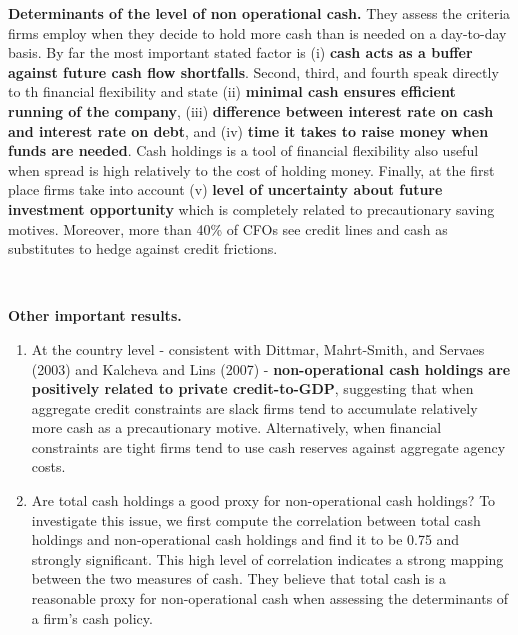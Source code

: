 \documentclass{article}
\begin{document}
{\textbf{Determinants of the level of non operational cash.} They assess the criteria firms employ when they decide to hold more cash than is needed on a day-to-day basis. By far the most important stated factor is (i) \textbf{cash acts as a buffer against future cash flow shortfalls}. Second, third, and fourth speak directly to th financial flexibility and state (ii) \textbf{minimal cash ensures efficient running of the company}, (iii) \textbf{difference between interest rate on cash and interest rate on debt}, and (iv) \textbf{time it takes to raise money when funds are needed}. Cash holdings is a tool of financial flexibility also useful when spread is high relatively to the cost of holding money. Finally, at the first place firms take into account (v) \textbf{level of uncertainty about future investment opportunity} which is completely related to precautionary saving motives. Moreover, more than 40\% of CFOs see credit lines and cash as substitutes to hedge against credit frictions.

\

\textbf{Other important results.} 
\begin{enumerate}
	\item At the country level - consistent with Dittmar, Mahrt-Smith, and Servaes (2003) and Kalcheva and Lins (2007) - \textbf{non-operational cash holdings are positively related to private credit-to-GDP}, suggesting that when aggregate credit constraints are slack firms tend to accumulate relatively more cash as a precautionary motive. Alternatively, when financial constraints are tight firms tend to use cash reserves against aggregate agency costs.
	\item Are total cash holdings a good proxy for non-operational cash holdings? To investigate this issue, we first compute the correlation between total cash holdings and non-operational cash holdings and find it to be 0.75 and strongly significant. This high level of correlation indicates a strong mapping between the two measures of cash. They believe that total cash is a reasonable proxy for non-operational cash when assessing the determinants of a firm's cash policy. 
\end{enumerate}











}
\end{document}
